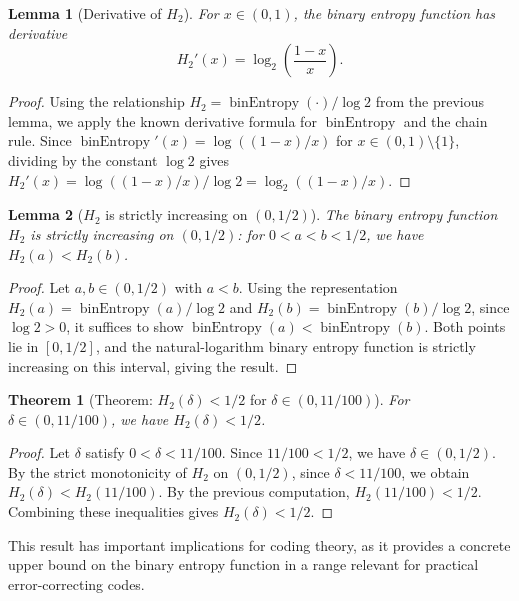 \documentclass[11pt]{article}
\theoremstyle{plain}
\newtheorem*{theorem}{Theorem}
\newtheorem*{lemma}{Lemma}
\theoremstyle{definition}
\theoremstyle{remark}
\begin{document}
\begin{lemma}[Derivative of $H_2$]
For $x \in (0, 1)$, the binary entropy function has derivative
\[
H_2'(x) = \log_2\!\left(\frac{1-x}{x}\right).
\]
\end{lemma}

\begin{proof}
Using the relationship $H_2 = \operatorname{binEntropy}(\cdot)/\log 2$ from the previous lemma, we apply the known derivative formula for $\operatorname{binEntropy}$ and the chain rule. Since $\operatorname{binEntropy}'(x) = \log((1-x)/x)$ for $x \in (0,1) \setminus \{1\}$, dividing by the constant $\log 2$ gives $H_2'(x) = \log((1-x)/x)/\log 2 = \log_2((1-x)/x)$.
\end{proof}

\begin{lemma}[$H_2$ is strictly increasing on $(0, 1/2)$]
The binary entropy function $H_2$ is strictly increasing on $(0, 1/2)$: for $0 < a < b < 1/2$, we have $H_2(a) < H_2(b)$.
\end{lemma}

\begin{proof}
Let $a, b \in (0, 1/2)$ with $a < b$. Using the representation $H_2(a) = \operatorname{binEntropy}(a)/\log 2$ and $H_2(b) = \operatorname{binEntropy}(b)/\log 2$, since $\log 2 > 0$, it suffices to show $\operatorname{binEntropy}(a) < \operatorname{binEntropy}(b)$. Both points lie in $[0, 1/2]$, and the natural-logarithm binary entropy function is strictly increasing on this interval, giving the result.
\end{proof}

\begin{theorem}[Theorem: $H_2(\delta) < 1/2$ for $\delta \in (0, 11/100)$]
For $\delta \in (0, 11/100)$, we have $H_2(\delta) < 1/2$.
\end{theorem}

\begin{proof}
Let $\delta$ satisfy $0 < \delta < 11/100$. Since $11/100 < 1/2$, we have $\delta \in (0, 1/2)$. By the strict monotonicity of $H_2$ on $(0, 1/2)$, since $\delta < 11/100$, we obtain $H_2(\delta) < H_2(11/100)$. By the previous computation, $H_2(11/100) < 1/2$. Combining these inequalities gives $H_2(\delta) < 1/2$.
\end{proof}

This result has important implications for coding theory, as it provides a concrete upper bound on the binary entropy function in a range relevant for practical error-correcting codes.
\end{document}
